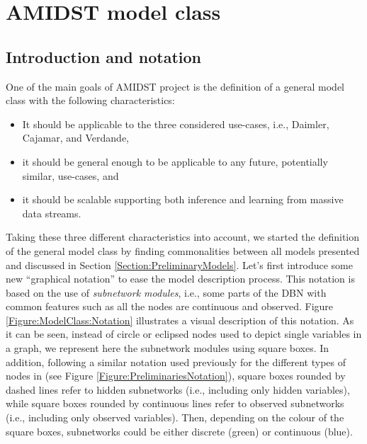\section{AMIDST model class}

\subsection{Introduction and notation}

One of the main goals of AMIDST project is the definition of a general model class with the following characteristics: 

\begin{itemize}
\item It should be applicable to the three considered use-cases, i.e., Daimler, Cajamar, and Verdande,

\item it should be general enough to be applicable to any future, potentially similar, use-cases, and

\item it should be scalable supporting both inference and learning from massive data streams.
 
\end{itemize}

Taking these three different characteristics into account, we started the definition of the general model class by finding commonalities between all models presented and discussed in Section \ref{Section:PreliminaryModels}. Let's first introduce some new ``graphical notation''  to ease the model description process. This notation is based on the use of \textit{subnetwork modules}, i.e., some parts of the DBN with common features such as all the nodes are continuous and observed. Figure \ref{Figure:ModelClass:Notation} illustrates a visual description of this notation. As it can be seen, instead of circle or eclipsed nodes used to depict single variables in a graph, we represent here the subnetwork modules using square boxes. In addition, following a similar notation used previously for the different types of nodes in (see Figure \ref{Figure:PreliminariesNotation}), square boxes rounded by dashed lines refer to hidden subnetworks (i.e., including only hidden variables), while square boxes rounded by continuous lines refer to observed subnetworks (i.e., including only observed variables). Then, depending on the colour of the square boxes, subnetworks could be either discrete (green) or continuous (blue). 


